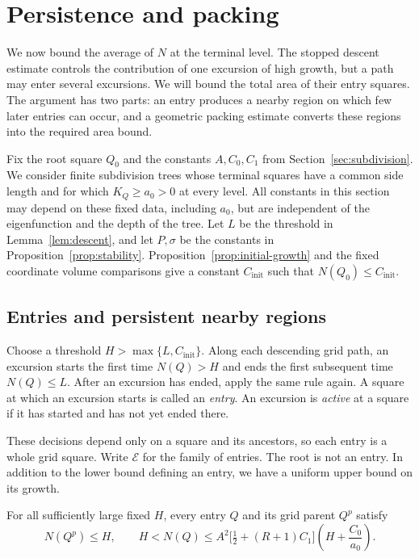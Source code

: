 \section{Persistence and packing}
\label{sec:persistence}

We now bound the average of $N$ at the terminal level. The stopped
descent estimate controls the contribution of one excursion of high
growth, but a path may enter several excursions. We will bound the
total area of their entry squares. The argument has two parts: an
entry produces a nearby region on which few later entries can occur,
and a geometric packing estimate converts these regions into the
required area bound.

Fix the root square $Q_0$ and the constants $A,C_0,C_1$ from
Section~\ref{sec:subdivision}. We consider finite subdivision trees whose
terminal squares have a common side length and for which $K_Q\ge a_0>0$
at every level. All constants in this section may depend on these fixed
data, including $a_0$, but are independent of the eigenfunction and the
depth of the tree. Let $L$ be the threshold in
Lemma~\ref{lem:descent}, and let $P,\sigma$ be the constants in
Proposition~\ref{prop:stability}. Proposition~\ref{prop:initial-growth}
and the fixed coordinate volume comparisons give a constant
$C_{\mathrm{init}}$ such that $N(Q_0)\le C_{\mathrm{init}}$.

\subsection{Entries and persistent nearby regions}

\begin{definition}[Excursions]
\label{def:excursions}
Choose a threshold $H>\max\{L,C_{\mathrm{init}}\}$. Along each descending
grid path, an excursion starts the first time $N(Q)>H$ and ends the first
subsequent time $N(Q)\le L$. After an excursion has ended, apply the same
rule again. A square at which an excursion starts is called an
\emph{entry}. An excursion is \emph{active} at a square if it has started
and has not yet ended there.
\end{definition}

These decisions depend only on a square and its ancestors, so each entry
is a whole grid square. Write $\mathcal E$ for the family of entries.
The root is not an entry. In addition to the
lower bound defining an entry, we have a uniform upper bound on its
growth.

\begin{lemma}
\label{lem:entry-bound}
For all sufficiently large fixed $H$, every entry $Q$ and its grid
parent $Q^p$ satisfy
\begin{equation}
\label{eq:entry-bound}
 N(Q^p)\le H,
 \qquad
 H<N(Q)\le
 A^2\bigl[\tfrac12+(R+1)C_1\bigr]
       \left(H+\frac{C_0}{a_0}\right).
\end{equation}
\end{lemma}

